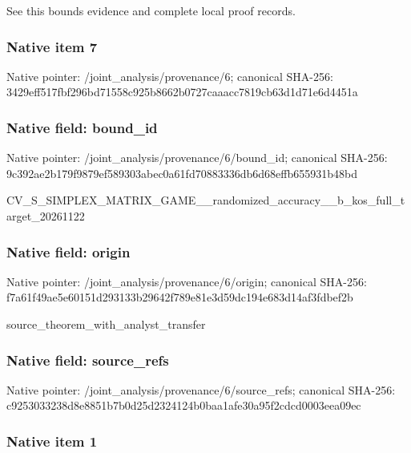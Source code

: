 \documentclass[10pt,a4paper]{article}
\begin{document}
See this bounds evidence and complete local proof records.


\subsubsection{Native item 7}


Native pointer: /joint\_analysis/provenance/6; canonical SHA-256: 3429eff517fbf296bd71558c\allowbreak{}925b8662b0727caaacc7819c\allowbreak{}b63d1d71e6d4451a



\subsubsection{Native field: bound\_id}


Native pointer: /joint\_analysis/provenance/6/bound\_id; canonical SHA-256: 9c392ae2b179f9879ef58930\allowbreak{}3abec0a61fd70883336db6d6\allowbreak{}8effb655931b48bd


CV\_S\_SIMPLEX\_MATRIX\_GAME\allowbreak{}\_\_randomized\_accuracy\_\_b\allowbreak{}\_kos\_full\_target\_2026112\allowbreak{}2


\subsubsection{Native field: origin}


Native pointer: /joint\_analysis/provenance/6/origin; canonical SHA-256: f7a61f49ae5e60151d293133\allowbreak{}b29642f789e81e3d59dc194e\allowbreak{}683d14af3fdbef2b


source\_theorem\_with\_analyst\_transfer


\subsubsection{Native field: source\_refs}


Native pointer: /joint\_analysis/provenan\allowbreak{}ce/6/source\_refs; canonical SHA-256: c9253033238d8e8851b7b0d2\allowbreak{}5d2324124b0baa1afe30a95f\allowbreak{}2cdcd0003eea09ec



\subsubsection{Native item 1}
\end{document}
